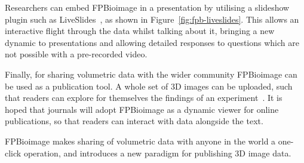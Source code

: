 Researchers can embed FPBioimage in a presentation by utilising a slideshow plugin such as LiveSlides~\cite{liveslides}, as shown in Figure~\ref{fig:fpb-liveslides}.
This allows an interactive flight through the data whilst talking about it, bringing a new dynamic to presentations and allowing detailed responses to questions which are not possible with a pre-recorded video.

Finally, for sharing volumetric data with the wider community FPBioimage can be used as a publication tool.
A whole set of 3D images can be uploaded, such that readers can explore for themselves the findings of an experiment~\cite{teplensky2017temperature}.
It is hoped that journals will adopt FPBioimage as a dynamic viewer for online publications, so that readers can interact with data alongside the text.

FPBioimage makes sharing of volumetric data with anyone in the world a one-click operation, and introduces a new paradigm for publishing 3D image data.
